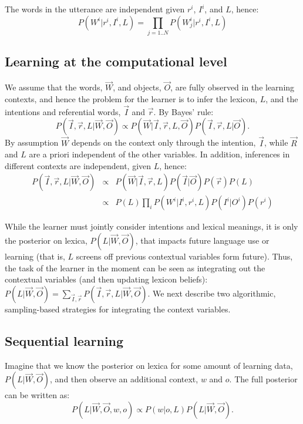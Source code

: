 \documentclass[man,noapacite,12pt]{apa2}
\begin{document}
The words in the utterance are independent given $r^{i}$, $I^{i}$, and $L$, hence:
\begin{equation}
P(W^{i}|r^{i}, I^{i}, L) = \prod_{j=1..N}P(W^{i}_{j}|r^{i}, I^{i}, L)
\end{equation}


\subsection{Learning at the computational level}

We assume that the words, $\vec{W}$, and objects, $\vec{O}$, are fully observed in the learning contexts, and hence the problem for the learner is to infer the lexicon, $L$, and the intentions and referential words, $\vec{I}$ and $\vec{r}$. By Bayes' rule:
$$
P( \vec{I}, \vec{r}, L | \vec{W}, \vec{O}) \propto P(\vec{W}| \vec{I}, \vec{r}, L, \vec{O} )  P(\vec{I},\vec{r},L | \vec{O}).
$$
By assumption $\vec{W}$ depends on the context only through the intention, $\vec{I}$, while $\vec{R}$ and $L$ are a priori independent of the other variables. In addition, inferences in different contexts are independent, given $L$, hence:
\begin{eqnarray}
P( \vec{I}, \vec{r}, L | \vec{W}, \vec{O}) &\propto& P(\vec{W}| \vec{I}, \vec{r}, L ) P(\vec{I} | \vec{O}) P(\vec{r})P(L) \\
&\propto& P(L) \prod_{i} P(W^{i}| I^{i}, r^{i}, L ) P(I^{i} | O^{i}) P(r^{i})
\end{eqnarray}


While the learner must jointly consider intentions and lexical meanings, it is only the posterior on lexica, $P(L|\vec{W},\vec{O})$, that impacts future language use or learning (that is, $L$ screens off previous contextual variables form future). Thus, the task of the learner in the moment can be seen as integrating out the contextual variables (and then updating lexicon beliefs): $P(L|\vec{W},\vec{O}) = \sum_{\vec{I}, \vec{r}} P( \vec{I}, \vec{r}, L | \vec{W}, \vec{O})$. We next describe two algorithmic, sampling-based strategies for integrating the context variables.


\subsection{Sequential learning}

Imagine that we know the posterior on lexica for some amount of learning data,  $P(L|\vec{W},\vec{O})$, and then observe an additional context, $w$ and $o$. The full posterior can be written as:
$$
P(L|\vec{W},\vec{O}, w, o) \propto P(w|o,L)P(L|\vec{W},\vec{O}).
$$
\end{document}
